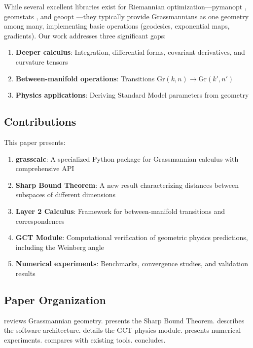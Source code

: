 \documentclass[11pt,a4paper]{article}
\newcommand{\Gr}{\mathrm{Gr}}
\begin{document}
While several excellent libraries exist for Riemannian optimization---pymanopt \citep{townsend2016pymanopt}, geomstats \citep{miolane2020geomstats}, and geoopt \citep{kochurov2020geoopt}---they typically provide Grassmannians as one geometry among many, implementing basic operations (geodesics, exponential maps, gradients). Our work addresses three significant gaps:

\begin{enumerate}
    \item \textbf{Deeper calculus}: Integration, differential forms, covariant derivatives, and curvature tensors
    \item \textbf{Between-manifold operations}: Transitions $\Gr(k,n) \to \Gr(k',n')$
    \item \textbf{Physics applications}: Deriving Standard Model parameters from geometry
\end{enumerate}

\subsection{Contributions}

This paper presents:

\begin{enumerate}
    \item \textbf{grasscalc}: A specialized Python package for Grassmannian calculus with comprehensive API
    \item \textbf{Sharp Bound Theorem}: A new result characterizing distances between subspaces of different dimensions
    \item \textbf{Layer 2 Calculus}: Framework for between-manifold transitions and correspondences
    \item \textbf{GCT Module}: Computational verification of geometric physics predictions, including the Weinberg angle
    \item \textbf{Numerical experiments}: Benchmarks, convergence studies, and validation results
\end{enumerate}

\subsection{Paper Organization}

 reviews Grassmannian geometry.  presents the Sharp Bound Theorem.  describes the software architecture.  details the GCT physics module.  presents numerical experiments.  compares with existing tools.  concludes.
\end{document}

